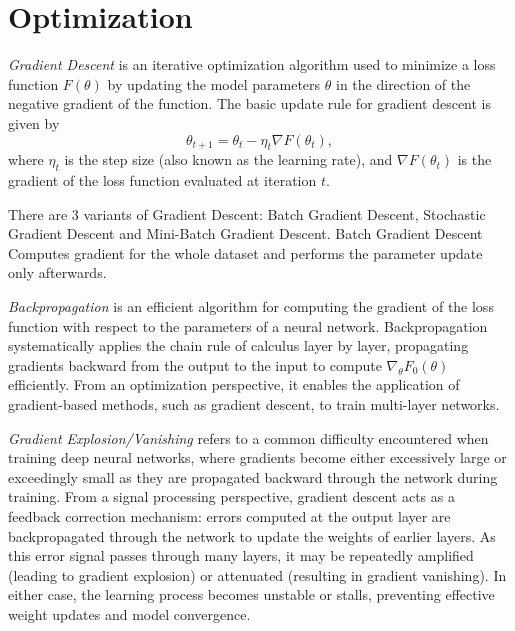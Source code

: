 \section{Optimization}

\begin{definition}
  \textit{Gradient Descent} \autocite{sun2020optimization} \autocite{ruder2017overviewgradientdescentoptimization} is an iterative optimization algorithm used to minimize a loss function \( F(\theta) \) by updating the model parameters \( \theta \) in the direction of the negative gradient of the function. The basic update rule for gradient descent is given by
  \[
    \theta_{t+1} = \theta_t - \eta_t \nabla F(\theta_t),
  \]
  where \( \eta_t \) is the step size (also known as the learning rate), and \( \nabla F(\theta_t) \) is the gradient of the loss function evaluated at iteration \( t \).
\end{definition}

There are 3 variants \autocite{ruder2017overviewgradientdescentoptimization} of Gradient Descent: Batch Gradient Descent, Stochastic Gradient Descent and Mini-Batch Gradient Descent. Batch Gradient Descent Computes gradient for the whole dataset and performs the parameter update only afterwards.

\begin{definition}
  \textit{Backpropagation} \autocite{sun2020optimization} is an efficient algorithm for computing the gradient of the loss function with respect to the parameters of a neural network. Backpropagation systematically applies the chain rule of calculus layer by layer, propagating gradients backward from the output to the input to compute \( \nabla_\theta F_0(\theta) \) efficiently. From an optimization perspective, it enables the application of gradient-based methods, such as gradient descent, to train multi-layer networks.
\end{definition}

\begin{definition}
  \textit{Gradient Explosion/Vanishing} \autocite{sun2020optimization} refers to a common difficulty encountered when training deep neural networks, where gradients become either excessively large or exceedingly small as they are propagated backward through the network during training. From a signal processing perspective, gradient descent acts as a feedback correction mechanism: errors computed at the output layer are backpropagated through the network to update the weights of earlier layers. As this error signal passes through many layers, it may be repeatedly amplified (leading to gradient explosion) or attenuated (resulting in gradient vanishing). In either case, the learning process becomes unstable or stalls, preventing effective weight updates and model convergence.
\end{definition}

